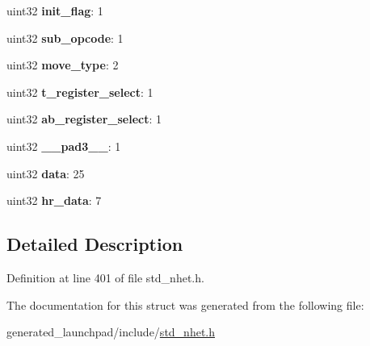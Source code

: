 \begin{DoxyCompactItemize}
uint32 {\bfseries init\+\_\+flag}\+: 1
\item 
\mbox{\label{structADM32__format_a05cbd6516dc0f7aa6831f439c7a64b53}} 
uint32 {\bfseries sub\+\_\+opcode}\+: 1
\item 
\mbox{\label{structADM32__format_ad426ffc1888bf143a3ad2f10b749186e}} 
uint32 {\bfseries move\+\_\+type}\+: 2
\item 
\mbox{\label{structADM32__format_a05de383ac106b3b74d1846fb99bc8ef7}} 
uint32 {\bfseries t\+\_\+register\+\_\+select}\+: 1
\item 
\mbox{\label{structADM32__format_a4f1efc055d7d5ab564569656cf901f32}} 
uint32 {\bfseries ab\+\_\+register\+\_\+select}\+: 1
\item 
\mbox{\label{structADM32__format_a04f0b7c9431928c508e6fbae12edfeda}} 
uint32 {\bfseries \+\_\+\+\_\+pad3\+\_\+\+\_\+}\+: 1
\item 
\mbox{\label{structADM32__format_aa978c843ac5ea41e9e4d0427cd5fb8ec}} 
uint32 {\bfseries data}\+: 25
\item 
\mbox{\label{structADM32__format_acc90ad032f6fb11d1b370c1f4862297c}} 
uint32 {\bfseries hr\+\_\+data}\+: 7
\end{DoxyCompactItemize}


\subsection{Detailed Description}


Definition at line 401 of file std\+\_\+nhet.\+h.



The documentation for this struct was generated from the following file\+:\begin{DoxyCompactItemize}
\item 
generated\+\_\+launchpad/include/\mbox{\hyperlink{std__nhet_8h}{std\+\_\+nhet.\+h}}\end{DoxyCompactItemize}

